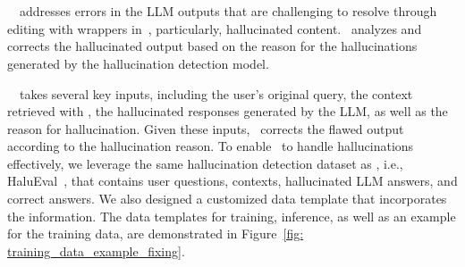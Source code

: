 \section{\goodname~\fixing}\label{sec:fixing}


\goodname~\fixing~addresses errors in the LLM  outputs that are challenging to resolve through editing with wrappers in~\customization, particularly, hallucinated content. \fixing~analyzes and corrects the hallucinated output based on the reason for the hallucinations generated by the hallucination detection model. 


\goodname~\fixing~takes several key inputs, including the user's original query, the context retrieved with \grounding, the hallucinated responses generated by the LLM, as well as the reason for hallucination. 
Given these inputs, \fixing~corrects the flawed output according to the hallucination reason.
To enable \fixing~to handle hallucinations effectively, we  leverage the same hallucination detection dataset as \detection, i.e., HaluEval~\citep{li2023halueval}, that contains user questions, contexts, hallucinated LLM answers, and correct answers. 
We also designed a customized data template that incorporates the information. The data templates for training, inference, as well as an example for the training data, are demonstrated in Figure~\ref{fig: training_data_example_fixing}. 
